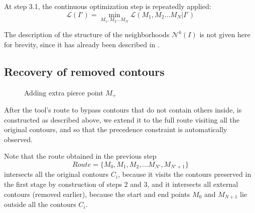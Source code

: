 \documentclass[]{llncs}
\begin{document}
At step 3.1,
the continuous optimization step is repeatedly applied:
$$
\mathcal L (I') = \min_{M_1, M_2 \dots M_N}
  \mathcal L (M_1, M_2 \dots M_N | I')
$$

The description of the structure of the neighborhoods
$\mathcal N^k(I)$
is not given here for brevity,
since it has already been described in
\cite{berlin2019}.

\subsection{Recovery of removed contours}

\begin{figure}
  \centering
  \caption{Adding extra pierce point $M_+$}
  \label{extra-pierce-point}
\end{figure}

After the tool’s route
to bypass contours
that do not contain others inside,
is constructed as described above,
we extend it to the full route
visiting all the original contours,
and so that the precedence constraint is
automatically
observed.

Note that the route obtained in the previous step
\begin{equation}
Route = \{ M_0, M_1, M_2, \dots M_{N'}, M_{N'+1}\}
\label{route0}
\end{equation}
intersects all the original contours
$C_i$,
because it visits the contours preserved in the first stage
by construction of steps 2 and 3,
and it intersects all external contours
(removed earlier),
because the start and end points
$M_0$ and
$M_{N + 1}$
lie outside all the contours
$C_i$.
\end{document}
